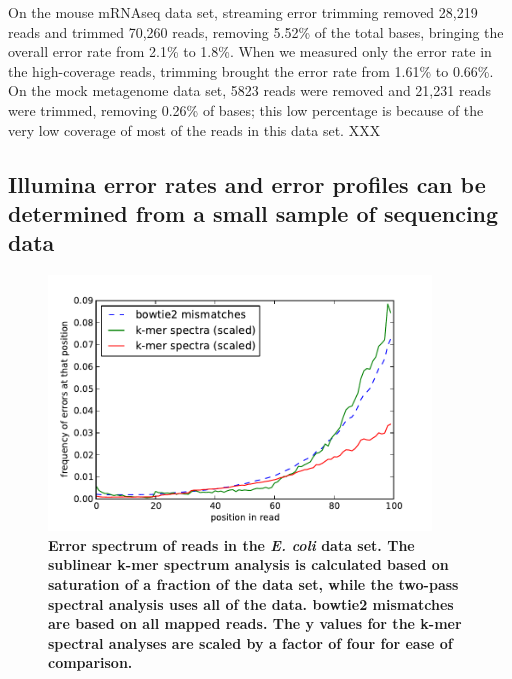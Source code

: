 \documentclass{article}
\begin{document}

% 


On the mouse mRNAseq data set, streaming error trimming removed 28,219
reads and trimmed 70,260 reads, removing 5.52\% of the total bases,
bringing the overall error rate from 2.1\% to 1.8\%.  When we measured
only the error rate in the high-coverage reads, trimming brought the
error rate from 1.61\% to 0.66\%.  On the mock metagenome data set,
5823 reads were removed and 21,231 reads were trimmed, removing 0.26\%
of bases; this low percentage is because of the very low coverage of
most of the reads in this data set.  XXX

\subsection{Illumina error rates and error profiles can be determined from a
small sample of sequencing data}

\begin{figure}[!ht]
 \centerline{\includegraphics[width=4in]{./figures/ecoli-errhist}}
\caption{{\bf Error spectrum of reads in the {\em E. coli} data
    set. The sublinear k-mer spectrum analysis is calculated based on
    saturation of a fraction of the data set, while the two-pass
    spectral analysis uses all of the data.  bowtie2 mismatches are
    based on all mapped reads.  The y values for the k-mer spectral
    analyses are scaled by a factor of four for ease of comparison.}}
\label{fig:ecoli_err}
\end{figure}
\end{document}
